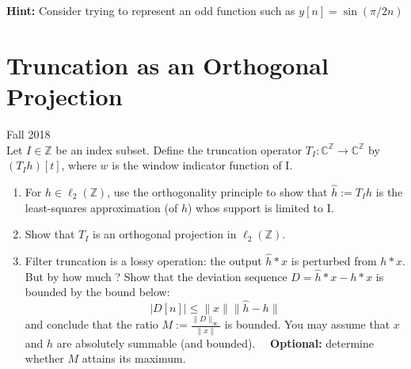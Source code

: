 \documentclass[12pt]{article}
\newcommand{\0}{\mathbf{0}}
\newcommand{\1}{\mathbf{1}}
\begin{document}
\textbf{Hint: } Consider trying to represent an odd function such as $y[n] = \sin(\pi/2 n)$

\pagebreak

\section{Truncation as an Orthogonal Projection}
Fall 2018 \\
Let $I \in \mathbb{Z}$ be an index subset. Define the truncation operator $T_I: \mathbb{C}^\mathbb{Z} \rightarrow \mathbb{C}^\mathbb{Z}$ by $(T_Ih)[t]$, where $w$ is the window indicator function of I.
\begin{enumerate}
    \item For $h \in \ell_2(\mathbb{Z})$, use the orthogonality principle to show that $\hat h := T_I h$ is the least-squares approximation (of $h$) whos support is limited to I.
    \item Show that $T_I$ is an orthogonal projection in $\ell_2(\mathbb{Z})$.
    \item Filter truncation is a lossy operation: the output $\hat h \ast x$ is perturbed from $h \ast x$. But by how much ? Show that the deviation sequence $D = \hat{h} \ast x - h \ast x$ is bounded by the bound below:
    \begin{equation}
        |D[n]| \leq \|x\|\|\hat h - h\|
    \end{equation}
    and conclude that the ratio $M := \frac{\|D\|_\infty}{\|x\|}$ is bounded. You may assume that $x$ and $h$ are absolutely summable (and bounded). \ \
    \textbf{Optional: } determine whether $M$ attains its maximum.
\end{enumerate}

\pagebreak
\end{document}
